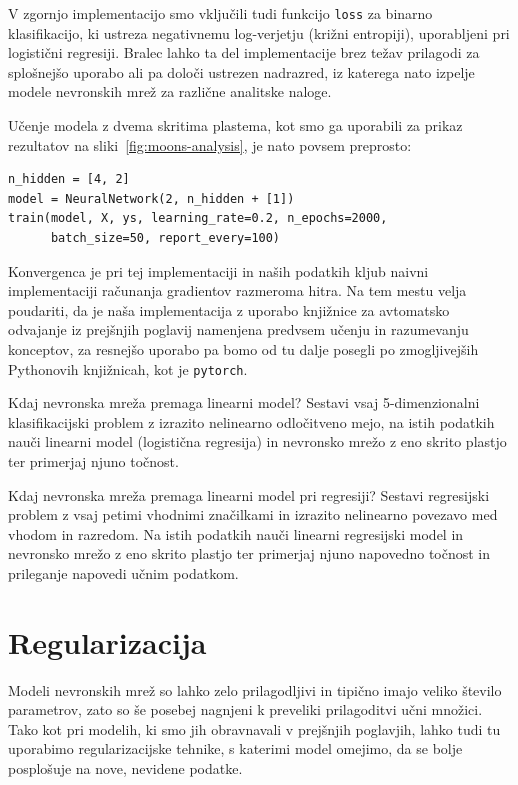 V zgornjo implementacijo smo vključili tudi funkcijo \texttt{loss} za binarno klasifikacijo, ki ustreza negativnemu log-verjetju (križni entropiji), uporabljeni pri logistični regresiji. Bralec lahko ta del implementacije brez težav prilagodi za splošnejšo uporabo ali pa določi ustrezen nadrazred, iz katerega nato izpelje modele nevronskih mrež za različne analitske naloge.

Učenje modela z dvema skritima plastema, kot smo ga uporabili za prikaz rezultatov na sliki~\ref{fig:moons-analysis}, je nato povsem preprosto:

\vspace*{3mm}
\begin{lstlisting}
n_hidden = [4, 2]
model = NeuralNetwork(2, n_hidden + [1])
train(model, X, ys, learning_rate=0.2, n_epochs=2000, 
      batch_size=50, report_every=100)
\end{lstlisting}

Konvergenca je pri tej implementaciji in naših podatkih kljub naivni implementaciji računanja gradientov razmeroma hitra. Na tem mestu velja poudariti, da je naša implementacija z uporabo knjižnice za avtomatsko odvajanje iz prejšnjih poglavij namenjena predvsem učenju in razumevanju konceptov, za resnejšo uporabo pa bomo od tu dalje posegli po zmogljivejših Pythonovih knjižnicah, kot je \texttt{pytorch}.

\begin{exercise}{Kdaj nevronska mreža premaga linearni model?}
Sestavi vsaj 5-dimenzionalni klasifikacijski problem z izrazito nelinearno odločitveno mejo, na istih podatkih nauči linearni model (logistična regresija) in nevronsko mrežo z eno skrito plastjo ter primerjaj njuno točnost. 
\end{exercise}

\begin{exercise}{Kdaj nevronska mreža premaga linearni model pri regresiji?}
Sestavi regresijski problem z vsaj petimi vhodnimi značilkami in izrazito nelinearno povezavo med vhodom in razredom. Na istih podatkih nauči linearni regresijski model in nevronsko mrežo z eno skrito plastjo ter primerjaj njuno napovedno točnost in prileganje napovedi učnim podatkom.
\end{exercise}

\section{Regularizacija}

Modeli nevronskih mrež so lahko zelo prilagodljivi in tipično imajo veliko število parametrov, zato so še posebej nagnjeni k preveliki prilagoditvi učni množici. Tako kot pri modelih, ki smo jih obravnavali v prejšnjih poglavjih, lahko tudi tu uporabimo regularizacijske tehnike, s katerimi model omejimo, da se bolje posplošuje na nove, nevidene podatke.

